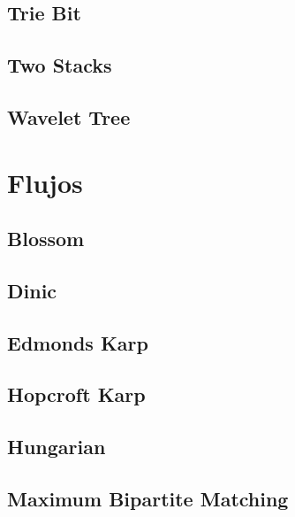 \subsection{Trie Bit}
\raggedbottom
\hrulefill
\subsection{Two Stacks}
\raggedbottom
\hrulefill
\subsection{Wavelet Tree}
\raggedbottom
\hrulefill

\section{Flujos}
\subsection{Blossom}
\raggedbottom
\hrulefill
\subsection{Dinic}
\raggedbottom
\hrulefill
\subsection{Edmonds Karp}
\raggedbottom
\hrulefill
\subsection{Hopcroft Karp}
\raggedbottom
\hrulefill
\subsection{Hungarian}
\raggedbottom
\hrulefill
\subsection{Maximum Bipartite Matching}
\raggedbottom
\hrulefill

